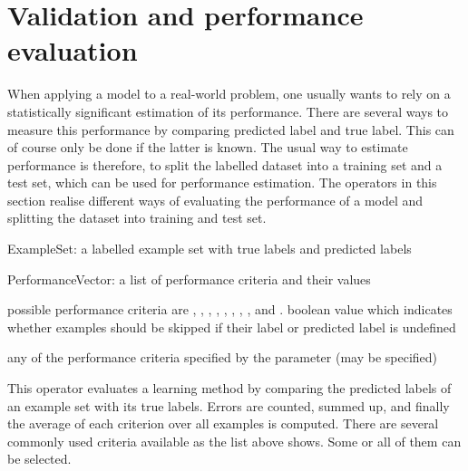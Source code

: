 \section{Validation and performance evaluation}

When applying a model to a real-world problem, one usually wants to
rely on a statistically significant estimation of its
performance. There are several ways to measure this performance
by comparing predicted label and true label. This can of course
only be done if the latter is known. The usual way to estimate
performance is therefore, to split the labelled dataset into a
training set and a test set, which can be used for performance
estimation. The operators in this section realise different ways of
evaluating the performance of a model and splitting the dataset into
training and test set.




\begin{opin}
\item[ExampleSet:] a labelled example set with true labels and predicted labels
\end{opin}

\begin{opout}
\item[PerformanceVector:] a list of performance criteria and their values
\end{opout}

\begin{parameters}
 possible performance criteria are
  , 
  , 
  ,
  , 
  ,\linebreak
  , 
  , 
  , and
  .
 boolean value which indicates whether
  examples should be skipped if their label or predicted label is undefined
\end{parameters}

\begin{values}
\val any of the performance criteria specified by the parameter 
   (may be specified)
\end{values}

\opdescr This operator evaluates a learning method 
by comparing the predicted labels of an example set with its true labels. 
Errors are counted, summed up, and finally the average of each criterion over all examples is computed. 
There are several commonly used criteria available as the list above shows. Some or all of them can be selected.



